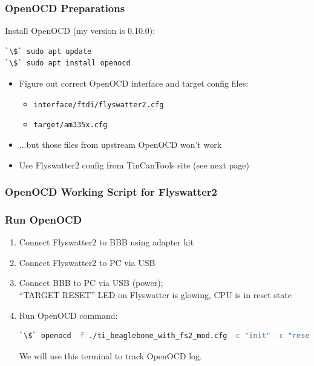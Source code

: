\begin{frame}[containsverbatim]
  \frametitle{OpenOCD Preparations}
  Install OpenOCD (my version is 0.10.0):
  \begin{lstlisting}[language=bash]
`\$` sudo apt update
`\$` sudo apt install openocd
  \end{lstlisting}

  \begin{itemize}
    \item Figure out correct OpenOCD interface and target config files:\\
      \begin{itemize}
        \item \texttt{interface/ftdi/flyswatter2.cfg}
        \item \texttt{target/am335x.cfg}
      \end{itemize}
    \item ...but those files from upstream OpenOCD won't work
    \item Use Flyswatter2 config from TinCanTools site (see next page)
  \end{itemize}
\end{frame}

\begin{frame}[containsverbatim,allowframebreaks=1]
  \frametitle{OpenOCD Working Script for Flyswatter2}
  
\end{frame}

\begin{frame}[containsverbatim]
  \frametitle{Run OpenOCD}
  \begin{enumerate}
  \item Connect Flyswatter2 to BBB using adapter kit
  \item Connect Flyswatter2 to PC via USB
  \item Connect BBB to PC via USB (power); \\
        ``TARGET RESET'' LED on Flyswatter is glowing, CPU is in reset state
  \item Run OpenOCD command:
    \begin{lstlisting}[language=bash,numbers=none]
`\$` openocd -f ./ti_beaglebone_with_fs2_mod.cfg -c "init" -c "reset init"
    \end{lstlisting}
  We will use this terminal to track OpenOCD log.
  \end{enumerate}
\end{frame}

